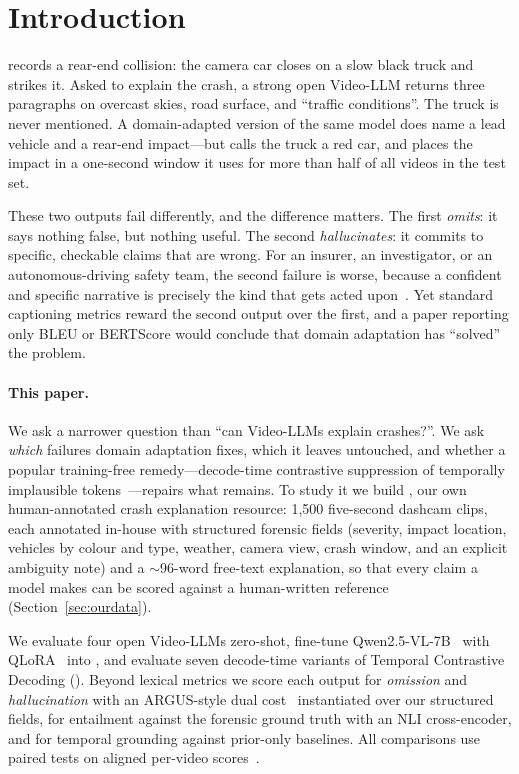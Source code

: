 \section{Introduction}
\label{sec:intro}

 records a rear-end collision: the camera car closes on a slow black truck and strikes it.
Asked to explain the crash, a strong open Video-LLM returns three paragraphs on overcast skies, road surface, and ``traffic conditions''.
The truck is never mentioned.
A domain-adapted version of the same model does name a lead vehicle and a rear-end impact---but calls the truck a red car, and places the impact in a one-second window it uses for more than half of all videos in the test set.

These two outputs fail differently, and the difference matters.
The first \emph{omits}: it says nothing false, but nothing useful.
The second \emph{hallucinates}: it commits to specific, checkable claims that are wrong.
For an insurer, an investigator, or an autonomous-driving safety team, the second failure is worse, because a confident and specific narrative is precisely the kind that gets acted upon~\cite{maynez2020faithfulness,ji2023survey}.
Yet standard captioning metrics reward the second output over the first, and a paper reporting only BLEU or BERTScore would conclude that domain adaptation has ``solved'' the problem.

\paragraph{This paper.}
We ask a narrower question than ``can Video-LLMs explain crashes?''.
We ask \emph{which} failures domain adaptation fixes, which it leaves untouched, and whether a popular training-free remedy---decode-time contrastive suppression of temporally implausible tokens~\cite{season2025,vcd}---repairs what remains.
To study it we build \dataset{}, our own human-annotated crash explanation resource: 1{,}500 five-second dashcam clips, each annotated in-house with structured forensic fields (severity, impact location, vehicles by colour and type, weather, camera view, crash window, and an explicit ambiguity note) and a $\sim$96-word free-text explanation, so that every claim a model makes can be scored against a human-written reference (Section~\ref{sec:ourdata}).

We evaluate four open Video-LLMs zero-shot, fine-tune Qwen2.5-VL-7B~\cite{qwen25vl} with QLoRA~\cite{qlora} into \crashlogic{}, and evaluate seven decode-time variants of Temporal Contrastive Decoding (\tcd).
Beyond lexical metrics we score each output for \emph{omission} and \emph{hallucination} with an ARGUS-style dual cost~\cite{argus2025} instantiated over our structured fields, for entailment against the forensic ground truth with an NLI cross-encoder, and for temporal grounding against prior-only baselines.
All comparisons use paired tests on aligned per-video scores~\cite{dror2018hitchhiker}.

